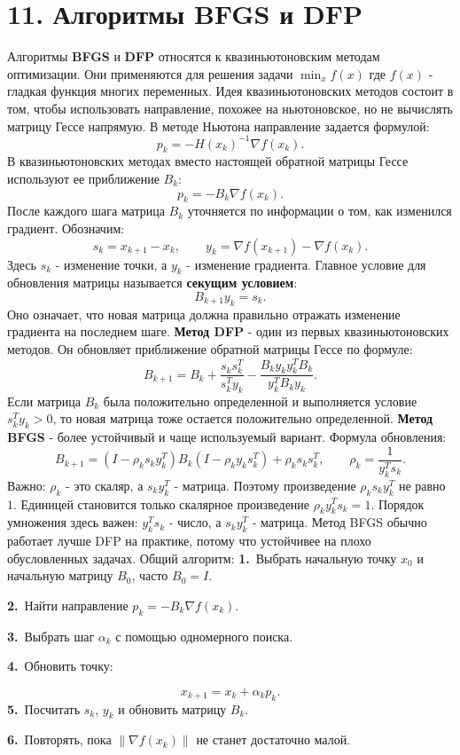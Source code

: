 \documentclass[12pt,a4paper]{article}
\begin{document}
\section{11. Алгоритмы BFGS и DFP}
Алгоритмы \textbf{BFGS} и \textbf{DFP} относятся к квазиньютоновским методам оптимизации. Они применяются для решения задачи $\min_x f(x)$ где $f(x)$ - гладкая функция многих переменных.
Идея квазиньютоновских методов состоит в том, чтобы использовать направление, похожее на ньютоновское, но не вычислять матрицу Гессе напрямую. В методе Ньютона направление задается формулой:
\[
p_k=-H(x_k)^{-1}\nabla f(x_k).
\]
В квазиньютоновских методах вместо настоящей обратной матрицы Гессе используют ее приближение $B_k$:
\[
p_k=-B_k\nabla f(x_k).
\]
После каждого шага матрица $B_k$ уточняется по информации о том, как изменился градиент.
Обозначим:
\[
s_k=x_{k+1}-x_k,\qquad y_k=\nabla f(x_{k+1})-\nabla f(x_k).
\]
Здесь $s_k$ - изменение точки, а $y_k$ - изменение градиента.
Главное условие для обновления матрицы называется \textbf{секущим условием}:
\[
B_{k+1}y_k=s_k.
\]
Оно означает, что новая матрица должна правильно отражать изменение градиента на последнем шаге.
\textbf{Метод DFP} - один из первых квазиньютоновских методов. Он обновляет приближение обратной матрицы Гессе по формуле:
\[
B_{k+1}=B_k+\frac{s_ks_k^T}{s_k^Ty_k}-\frac{B_ky_ky_k^TB_k}{y_k^TB_ky_k}.
\]
Если матрица $B_k$ была положительно определенной и выполняется условие $s_k^Ty_k>0$, то новая матрица тоже остается положительно определенной.
\textbf{Метод BFGS} - более устойчивый и чаще используемый вариант. Формула обновления:
\[
B_{k+1}=
\left(I-\rho_ks_ky_k^T\right)B_k
\left(I-\rho_ky_ks_k^T\right)
+\rho_ks_ks_k^T,
\qquad
\rho_k=\frac{1}{y_k^Ts_k}.
\]
Важно: $\rho_k$ - это скаляр, а $s_ky_k^T$ - матрица. Поэтому произведение $\rho_ks_ky_k^T$ не равно $1$. Единицей становится только скалярное произведение $\rho_k y_k^Ts_k=1$. Порядок умножения здесь важен: $y_k^Ts_k$ - число, а $s_ky_k^T$ - матрица.
Метод BFGS обычно работает лучше DFP на практике, потому что устойчивее на плохо обусловленных задачах.
Общий алгоритм:
\noindent\textbf{1.}\ Выбрать начальную точку $x_0$ и начальную матрицу $B_0$, часто $B_0=I$.\par
\noindent\textbf{2.}\ Найти направление $p_k=-B_k\nabla f(x_k)$.\par
\noindent\textbf{3.}\ Выбрать шаг $\alpha_k$ с помощью одномерного поиска.\par
\noindent\textbf{4.}\ Обновить точку:\par
\[
x_{k+1}=x_k+\alpha_kp_k.
\]
\noindent\textbf{5.}\ Посчитать $s_k$, $y_k$ и обновить матрицу $B_k$.\par
\noindent\textbf{6.}\ Повторять, пока $\|\nabla f(x_k)\|$ не станет достаточно малой.\par
\end{document}
